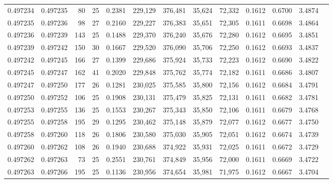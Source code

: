 \begin{tabular}{rrrrrrrrrrrrr}
0.497234 & 0.497235 &  80 &  25 &                                     0.2381 & 229,129 & 376,481 &  35,624 &  72,332 & 0.1612 & 0.6700 & 3.4874 \\
0.497235 & 0.497236 &  98 &  27 &                                     0.2160 & 229,227 & 376,383 &  35,651 &  72,305 & 0.1611 & 0.6698 & 3.4864 \\
0.497236 & 0.497239 & 143 &  25 &                                     0.1488 & 229,370 & 376,240 &  35,676 &  72,280 & 0.1612 & 0.6695 & 3.4851 \\
0.497239 & 0.497242 & 150 &  30 &                                     0.1667 & 229,520 & 376,090 &  35,706 &  72,250 & 0.1612 & 0.6693 & 3.4837 \\
0.497242 & 0.497245 & 166 &  27 &                                     0.1399 & 229,686 & 375,924 &  35,733 &  72,223 & 0.1612 & 0.6690 & 3.4822 \\
0.497245 & 0.497247 & 162 &  41 &                                     0.2020 & 229,848 & 375,762 &  35,774 &  72,182 & 0.1611 & 0.6686 & 3.4807 \\
0.497247 & 0.497250 & 177 &  26 &                                     0.1281 & 230,025 & 375,585 &  35,800 &  72,156 & 0.1612 & 0.6684 & 3.4791 \\
0.497250 & 0.497252 & 106 &  25 &                                     0.1908 & 230,131 & 375,479 &  35,825 &  72,131 & 0.1611 & 0.6682 & 3.4781 \\
0.497253 & 0.497255 & 136 &  25 &                                     0.1553 & 230,267 & 375,343 &  35,850 &  72,106 & 0.1611 & 0.6679 & 3.4768 \\
0.497255 & 0.497258 & 195 &  29 &                                     0.1295 & 230,462 & 375,148 &  35,879 &  72,077 & 0.1612 & 0.6677 & 3.4750 \\
0.497258 & 0.497260 & 118 &  26 &                                     0.1806 & 230,580 & 375,030 &  35,905 &  72,051 & 0.1612 & 0.6674 & 3.4739 \\
0.497260 & 0.497262 & 108 &  26 &                                     0.1940 & 230,688 & 374,922 &  35,931 &  72,025 & 0.1611 & 0.6672 & 3.4729 \\
0.497262 & 0.497263 &  73 &  25 &                                     0.2551 & 230,761 & 374,849 &  35,956 &  72,000 & 0.1611 & 0.6669 & 3.4722 \\
0.497263 & 0.497266 & 195 &  25 &                                     0.1136 & 230,956 & 374,654 &  35,981 &  71,975 & 0.1612 & 0.6667 & 3.4704 \\

\end{tabular}
